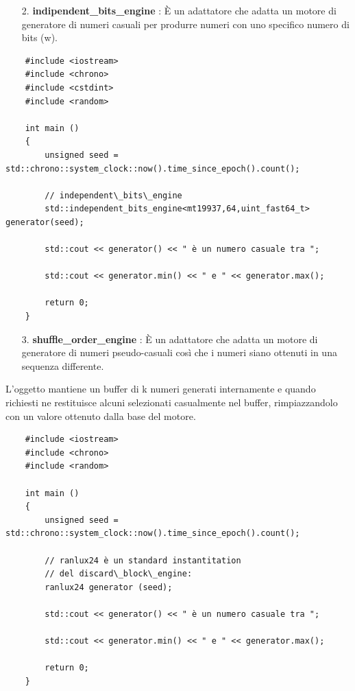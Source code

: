 \begin{enumerate}
	\item[2.] \textsf{\small \textbf{indipendent\_bits\_engine} : È un adattatore che adatta un motore di generatore di numeri casuali per produrre numeri con uno specifico numero di bits (w).}
\end{enumerate}

\begin{lstlisting}
	#include <iostream>
	#include <chrono>
	#include <cstdint>
	#include <random>
	
	int main ()
	{
		unsigned seed = std::chrono::system_clock::now().time_since_epoch().count();
		
		// independent\_bits\_engine
		std::independent_bits_engine<mt19937,64,uint_fast64_t> generator(seed);
		
		std::cout << generator() << " è un numero casuale tra ";
		
		std::cout << generator.min() << " e " << generator.max();
		
		return 0;
	}
\end{lstlisting}

\begin{enumerate}
	\item[3.] \textsf{\small \textbf{shuffle\_order\_engine} : È un adattatore che adatta un motore di generatore di numeri pseudo-casuali così che i numeri siano ottenuti in una sequenza differente.}
\end{enumerate}

\textsf{\small L'oggetto mantiene un buffer di k numeri generati internamente e quando richiesti ne restituisce alcuni selezionati casualmente nel buffer, rimpiazzandolo con un valore ottenuto dalla base del motore.} \\

\begin{lstlisting}
	#include <iostream>
	#include <chrono>
	#include <random>
	
	int main ()
	{
		unsigned seed = std::chrono::system_clock::now().time_since_epoch().count();
		
		// ranlux24 è un standard instantitation
		// del discard\_block\_engine:
		ranlux24 generator (seed);
		
		std::cout << generator() << " è un numero casuale tra ";
		
		std::cout << generator.min() << " e " << generator.max();
		
		return 0;
	}
\end{lstlisting}

